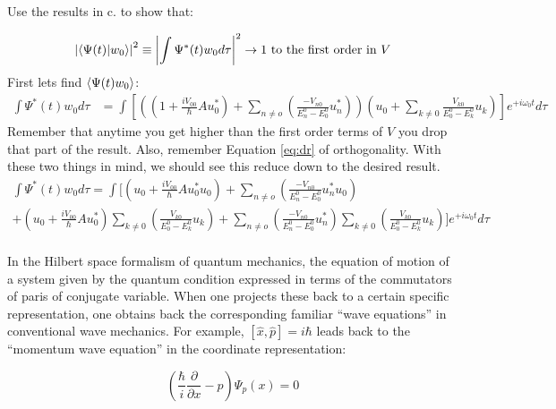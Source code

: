 \documentclass{jhwhw}
\begin{document}
Use the results in c. to show that:

\begin{equation}
	\label{eq:braket}
	\left|\braket{ \Psi(t) | w_0 }\right|^2 \equiv \left| \int \Psi^*(t)w_0 d\tau \right|^2 \rightarrow 1 \text{ to the first order in } V
\end{equation}
\solution
First lets find $\braket{\Psi(t)w_0}$:
\begin{align}
	\int \Psi^*(t)w_0 d\tau &= \int \left[ \left( \left(1 + \frac{i V_{00}}{\hbar} A u_0^*\right) + \sum\limits_{n \neq o}\left( \frac{-V_{n0}}{E_n^0 - E_0^0} u_n^*\right)\right)  \left(u_0 + \sum\limits_{k \neq 0} \frac{V_{k0}}{E_0^0 - E_k^0}u_k\right)\right]e^{+i \omega_0 t} d\tau
\end{align}
Remember that anytime you get higher than the first order terms of $V$ you drop that part of the result.  Also, remember Equation \eqref{eq:dr} of orthogonality.  With these two things in mind, we should see this reduce down to the desired result.
\begin{align}
	\int \Psi^*(t)w_0 d\tau =  \int \bigg[ \left( u_0 + \frac{i V_{00}}{\hbar} A u_0^*u_0\right) + \sum\limits_{n \neq o}\left( \frac{-V_{n0}}{E_n^0 - E_0^0} u_n^*u_0\right) \\
	 + \left(u_0 + \frac{i V_{00}}{\hbar} A u_0^*\right)  \sum\limits_{k \neq 0} \left( \frac{V_{k0}}{E_0^0 - E_k^0}u_k\right) + \sum\limits_{n \neq o}\left( \frac{-V_{n0}}{E_n^0 - E_0^0} u_n^*\right)\sum\limits_{k \neq 0} \left( \frac{V_{k0}}{E_0^0 - E_k^0}u_k\right) \bigg]e^{+i \omega_0 t} d\tau \\
\end{align}



\pagebreak[4]

In the Hilbert space formalism of quantum mechanics, the equation of motion of a system given by the quantum condition expressed in terms of the commutators of paris of conjugate variable.  When one projects these back to a certain specific representation, one obtains back the corresponding familiar ``wave equations'' in conventional wave mechanics.  For example, $[\hat{x},\hat{p}] = i \hbar$ leads back to the ``momentum wave equation'' in the coordinate representation:

\begin{equation}
	\label{eq:mwe}
	\left(\frac{\hbar}{i} \frac{\partial}{\partial x} - p\right)\Psi_p (x) = 0
\end{equation}
\end{document}
